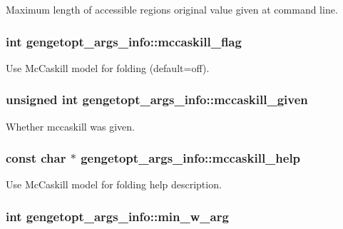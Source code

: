 Maximum length of accessible regions original value given at command line. 

\hypertarget{structgengetopt__args__info_a2c35d30cec02884776c507be1f1c22ed}{
\subsubsection[{mccaskill\+\_\+flag}]{\setlength{\rightskip}{0pt plus 5cm}int gengetopt\+\_\+args\+\_\+info\+::mccaskill\+\_\+flag}}\label{structgengetopt__args__info_a2c35d30cec02884776c507be1f1c22ed}


Use Mc\+Caskill model for folding (default=off). 

\hypertarget{structgengetopt__args__info_abdb41a52bf90de52d706f3a4b768fff1}{
\subsubsection[{mccaskill\+\_\+given}]{\setlength{\rightskip}{0pt plus 5cm}unsigned int gengetopt\+\_\+args\+\_\+info\+::mccaskill\+\_\+given}}\label{structgengetopt__args__info_abdb41a52bf90de52d706f3a4b768fff1}


Whether mccaskill was given. 

\hypertarget{structgengetopt__args__info_a153efa81aed0fc8be8e0e793cb62ffd7}{
\subsubsection[{mccaskill\+\_\+help}]{\setlength{\rightskip}{0pt plus 5cm}const char $\ast$ gengetopt\+\_\+args\+\_\+info\+::mccaskill\+\_\+help}}\label{structgengetopt__args__info_a153efa81aed0fc8be8e0e793cb62ffd7}


Use Mc\+Caskill model for folding help description. 

\hypertarget{structgengetopt__args__info_ab0d4deed1d0424a4131eaa7b40b9e4ab}{
\subsubsection[{min\+\_\+w\+\_\+arg}]{\setlength{\rightskip}{0pt plus 5cm}int gengetopt\+\_\+args\+\_\+info\+::min\+\_\+w\+\_\+arg}}\label{structgengetopt__args__info_ab0d4deed1d0424a4131eaa7b40b9e4ab}


